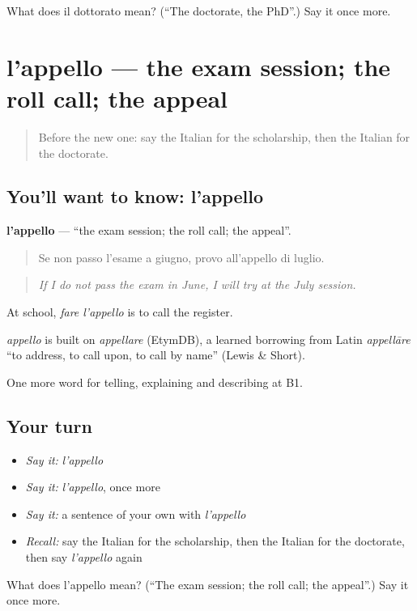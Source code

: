 \begin{tcolorbox}[breakable,colback=teal!4,colframe=teal!35!black,title={Before you move on}]
What does il dottorato mean? (\textquotedblleft{}The doctorate, the PhD\textquotedblright{}.) Say it once more.
\end{tcolorbox}
\section[l'appello]{l'appello — the exam session; the roll call; the appeal}

\label{lesson:IT-C381-appello}



\begin{quote}
Before the new one: say the Italian for the scholarship, then the Italian for the doctorate.
\end{quote}

\subsection*{You'll want to know: l'appello}
\textbf{l'appello} — \textquotedblleft{}the exam session; the roll call; the appeal\textquotedblright{}.

\begin{quote}
Se non passo l'esame a giugno, provo all'appello di luglio.
\end{quote}

\begin{quote}
\emph{If I do not pass the exam in June, I will try at the July session.}
\end{quote}

At school, \emph{fare l'appello} is to call the register.

\begin{cousinweb}
\emph{appello} is built on \emph{appellare} (EtymDB), a learned borrowing from Latin \emph{appellāre} \textquotedblleft{}to address, to call upon, to call by name\textquotedblright{} (Lewis \& Short).
\end{cousinweb}

\begin{grammarlens}[title={What you've built}]
One more word for telling, explaining and describing at B1.
\end{grammarlens}

\subsection*{Your turn}
\begin{itemize}
\raggedright
  \item \emph{Say it:} \emph{l'appello}
  \item \emph{Say it:} \emph{l'appello}, once more
  \item \emph{Say it:} a sentence of your own with \emph{l'appello}
  \item \emph{Recall:} say the Italian for the scholarship, then the Italian for the doctorate, then say \emph{l'appello} again
\end{itemize}

\begin{tcolorbox}[breakable,colback=teal!4,colframe=teal!35!black,title={Before you move on}]
What does l'appello mean? (\textquotedblleft{}The exam session; the roll call; the appeal\textquotedblright{}.) Say it once more.
\end{tcolorbox}
